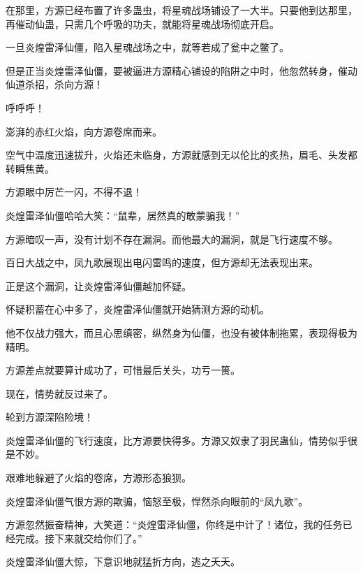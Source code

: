 \begin{this_body}
在那里，方源已经布置了许多蛊虫，将星魂战场铺设了一大半。只要他到达那里，再催动仙蛊，只需几个呼吸的功夫，就能将星魂战场彻底开启。

一旦炎煌雷泽仙僵，陷入星魂战场之中，就等若成了瓮中之鳖了。

但是正当炎煌雷泽仙僵，要被逼进方源精心铺设的陷阱之中时，他忽然转身，催动仙道杀招，杀向方源！

呼呼呼！

澎湃的赤红火焰，向方源卷席而来。

空气中温度迅速拔升，火焰还未临身，方源就感到无以伦比的炙热，眉毛、头发都转瞬焦黄。

方源眼中厉芒一闪，不得不退！

炎煌雷泽仙僵哈哈大笑：“鼠辈，居然真的敢蒙骗我！”

方源暗叹一声，没有计划不存在漏洞。而他最大的漏洞，就是飞行速度不够。

百日大战之中，凤九歌展现出电闪雷鸣的速度，但方源却无法表现出来。

正是这个漏洞，让炎煌雷泽仙僵越加怀疑。

怀疑积蓄在心中多了，炎煌雷泽仙僵就开始猜测方源的动机。

他不仅战力强大，而且心思缜密，纵然身为仙僵，也没有被体制拖累，表现得极为精明。

方源差点就要算计成功了，可惜最后关头，功亏一篑。

现在，情势就反过来了。

轮到方源深陷险境！

炎煌雷泽仙僵的飞行速度，比方源要快得多。方源又奴隶了羽民蛊仙，情势似乎很是不妙。

艰难地躲避了火焰的卷席，方源形态狼狈。

炎煌雷泽仙僵气恨方源的欺骗，恼怒至极，悍然杀向眼前的“凤九歌”。

方源忽然振奋精神，大笑道：“炎煌雷泽仙僵，你终是中计了！诸位，我的任务已经完成。接下来就交给你们了。”

炎煌雷泽仙僵大惊，下意识地就猛折方向，逃之夭夭。

\end{this_body}

